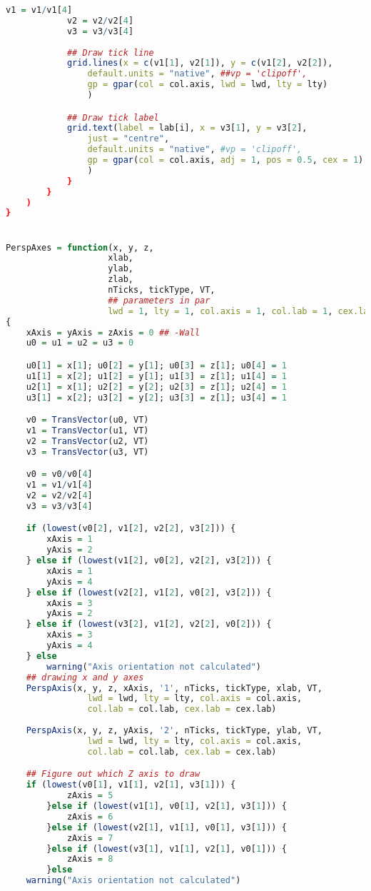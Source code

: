 \begin{lstlisting}[language = R]
            v1 = v1/v1[4]
            v2 = v2/v2[4]
            v3 = v3/v3[4]
            
            ## Draw tick line
            grid.lines(x = c(v1[1], v2[1]), y = c(v1[2], v2[2]),
                default.units = "native", ##vp = 'clipoff',
                gp = gpar(col = col.axis, lwd = lwd, lty = lty)
                )

            ## Draw tick label
            grid.text(label = lab[i], x = v3[1], y = v3[2],
                just = "centre",
                default.units = "native", #vp = 'clipoff',
                gp = gpar(col = col.axis, adj = 1, pos = 0.5, cex = 1)
                )
            }
        }
    )
}


PerspAxes = function(x, y, z, 
                    xlab, 
                    ylab, 
                    zlab, 
                    nTicks, tickType, VT, 
					## parameters in par
                    lwd = 1, lty = 1, col.axis = 1, col.lab = 1, cex.lab = 1)
{
    xAxis = yAxis = zAxis = 0 ## -Wall 
    u0 = u1 = u2 = u3 = 0

    u0[1] = x[1]; u0[2] = y[1]; u0[3] = z[1]; u0[4] = 1
    u1[1] = x[2]; u1[2] = y[1]; u1[3] = z[1]; u1[4] = 1
    u2[1] = x[1]; u2[2] = y[2]; u2[3] = z[1]; u2[4] = 1
    u3[1] = x[2]; u3[2] = y[2]; u3[3] = z[1]; u3[4] = 1

    v0 = TransVector(u0, VT)
    v1 = TransVector(u1, VT)
    v2 = TransVector(u2, VT)
    v3 = TransVector(u3, VT)

    v0 = v0/v0[4]
    v1 = v1/v1[4]
    v2 = v2/v2[4]
    v3 = v3/v3[4]

    if (lowest(v0[2], v1[2], v2[2], v3[2])) {
        xAxis = 1
        yAxis = 2
    } else if (lowest(v1[2], v0[2], v2[2], v3[2])) {
        xAxis = 1
        yAxis = 4
    } else if (lowest(v2[2], v1[2], v0[2], v3[2])) {
        xAxis = 3
        yAxis = 2
    } else if (lowest(v3[2], v1[2], v2[2], v0[2])) {
        xAxis = 3
        yAxis = 4
    } else
        warning("Axis orientation not calculated")
    ## drawing x and y axes
    PerspAxis(x, y, z, xAxis, '1', nTicks, tickType, xlab, VT, 
                lwd = lwd, lty = lty, col.axis = col.axis, 
                col.lab = col.lab, cex.lab = cex.lab)
                
    PerspAxis(x, y, z, yAxis, '2', nTicks, tickType, ylab, VT, 
                lwd = lwd, lty = lty, col.axis = col.axis, 
                col.lab = col.lab, cex.lab = cex.lab)

    ## Figure out which Z axis to draw
    if (lowest(v0[1], v1[1], v2[1], v3[1])) {
            zAxis = 5
        }else if (lowest(v1[1], v0[1], v2[1], v3[1])) {
            zAxis = 6
        }else if (lowest(v2[1], v1[1], v0[1], v3[1])) {
            zAxis = 7
        }else if (lowest(v3[1], v1[1], v2[1], v0[1])) {
            zAxis = 8
        }else
    warning("Axis orientation not calculated")


\end{lstlisting}
